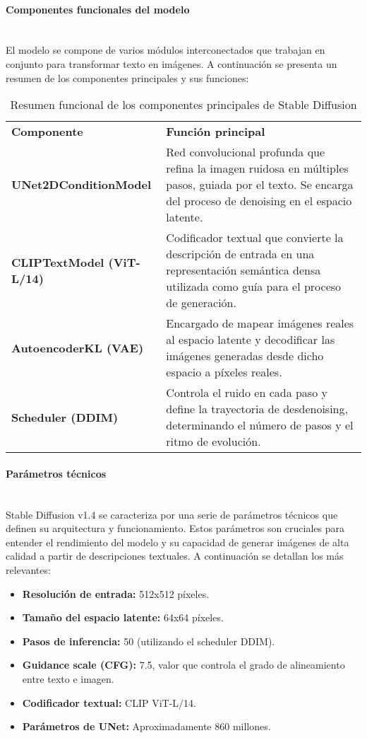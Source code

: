 \paragraph{\textbf{Componentes funcionales del modelo}} \mbox{}\\[0.5em]
El modelo se compone de varios módulos interconectados que trabajan en conjunto para transformar texto en imágenes. A continuación se presenta un resumen de los componentes principales y sus funciones:
\begin{table}[H]
\centering
\renewcommand{\arraystretch}{1.5}
\begin{tabular}{p{4.5cm}p{11cm}}
\rowcolor{gray!30}
\textbf{Componente} & \textbf{Función principal} \\
\rowcolor{gray!10}
\textbf{UNet2DConditionModel} & Red convolucional profunda que refina la imagen ruidosa en múltiples pasos, guiada por el texto. Se encarga del proceso de denoising en el espacio latente. \\
\textbf{CLIPTextModel (ViT-L/14)} & Codificador textual que convierte la descripción de entrada en una representación semántica densa utilizada como guía para el proceso de generación. \\
\rowcolor{gray!10}
\textbf{AutoencoderKL (VAE)} & Encargado de mapear imágenes reales al espacio latente y decodificar las imágenes generadas desde dicho espacio a píxeles reales. \\
\textbf{Scheduler (DDIM)} & Controla el ruido en cada paso y define la trayectoria de desdenoising, determinando el número de pasos y el ritmo de evolución. \\
\end{tabular}
\caption{Resumen funcional de los componentes principales de Stable Diffusion}
\label{tab:sd-components}
\end{table}

\paragraph{\textbf{Parámetros técnicos}} \mbox{}\\[0.5em]
Stable Diffusion v1.4 se caracteriza por una serie de parámetros técnicos que definen su arquitectura y funcionamiento. Estos parámetros son cruciales para entender el rendimiento del modelo y su capacidad de generar imágenes de alta calidad a partir de descripciones textuales. A continuación se detallan los más relevantes:
\begin{itemize}
\item \textbf{Resolución de entrada:} 512x512 píxeles.
\item \textbf{Tamaño del espacio latente:} 64x64 píxeles.
\item \textbf{Pasos de inferencia:} 50 (utilizando el scheduler DDIM).
\item \textbf{Guidance scale (CFG):} 7.5, valor que controla el grado de alineamiento entre texto e imagen.
\item \textbf{Codificador textual:} CLIP ViT-L/14.
\item \textbf{Parámetros de UNet:} Aproximadamente 860 millones.
\end{itemize}

